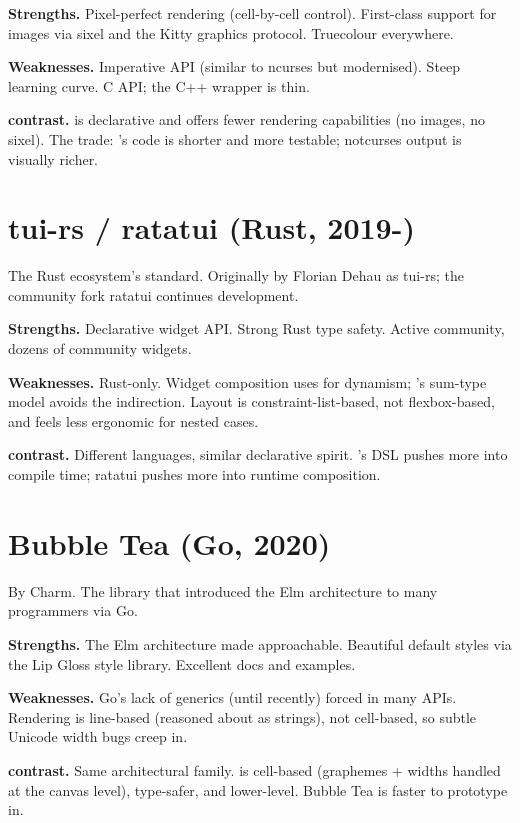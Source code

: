 \textbf{Strengths.} Pixel-perfect rendering (cell-by-cell control).
First-class support for images via sixel and the Kitty graphics
protocol. Truecolour everywhere.

\textbf{Weaknesses.} Imperative API (similar to ncurses but
modernised). Steep learning curve. C API; the C++ wrapper is
thin.

\textbf{\maya{} contrast.} \maya{} is declarative and offers
fewer rendering capabilities (no images, no sixel). The trade:
\maya{}'s code is shorter and more testable; notcurses output is
visually richer.

\section{tui-rs / ratatui (Rust, 2019-)}

The Rust ecosystem's standard. Originally by Florian Dehau as
tui-rs; the community fork ratatui continues development.

\textbf{Strengths.} Declarative widget API. Strong Rust type
safety. Active community, dozens of community widgets.

\textbf{Weaknesses.} Rust-only. Widget composition uses
 for dynamism; \maya{}'s sum-type model
avoids the indirection. Layout is constraint-list-based, not
flexbox-based, and feels less ergonomic for nested cases.

\textbf{\maya{} contrast.} Different languages, similar
declarative spirit. \maya{}'s DSL pushes more into compile time;
ratatui pushes more into runtime composition.

\section{Bubble Tea (Go, 2020)}

By Charm. The library that introduced the Elm architecture to
many programmers via Go.

\textbf{Strengths.} The Elm architecture made approachable.
Beautiful default styles via the Lip Gloss style library.
Excellent docs and examples.

\textbf{Weaknesses.} Go's lack of generics (until recently)
forced  in many APIs. Rendering is line-based
(reasoned about as strings), not cell-based, so subtle Unicode
width bugs creep in.

\textbf{\maya{} contrast.} Same architectural family. \maya{}
is cell-based (graphemes + widths handled at the canvas level),
type-safer, and lower-level. Bubble Tea is faster to prototype in.

